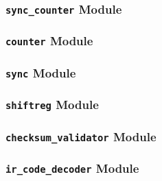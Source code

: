 \documentclass[a4paper]{article}
\makeatletter
\newcommand{\filecaption}[1]{\filename@parse{#1}\filename@base.\filename@ext}
\newcommand{\filelisting}[2][]{%
}
\makeatother
\begin{document}
\subsubsection{\texttt{sync\_counter} Module}
\filelisting[label=lst:sim_vcr_sync_counter]{../do_files/vcr_remote/sync_counter.do}

\subsubsection{\texttt{counter} Module}
\filelisting[label=lst:sim_vcr_counter]{../do_files/vcr_remote/counter.do}

\subsubsection{\texttt{sync} Module}
\filelisting[label=lst:sim_vcr_sync]{../do_files/vcr_remote/sync.do}

\subsubsection{\texttt{shiftreg} Module}
\filelisting[label=lst:sim_vcr_shiftreg]{../do_files/vcr_remote/shiftreg.do}

\subsubsection{\texttt{checksum\_validator} Module}
\filelisting[label=lst:sim_vcr_checksum_validator]{../do_files/vcr_remote/checksum_validator.do}

\subsubsection{\texttt{ir\_code\_decoder} Module}
\filelisting[label=lst:sim_vcr_ir_code_decoder]{../do_files/vcr_remote/ir_code_decoder.do}

\printbibliography
\end{document}
